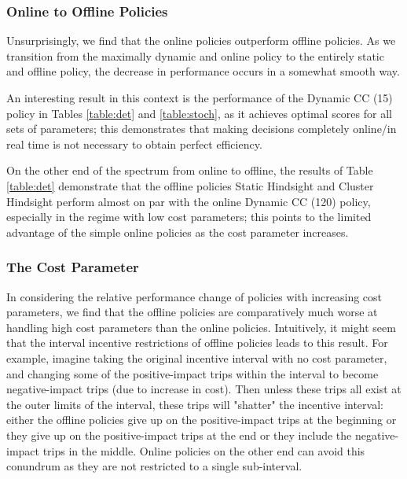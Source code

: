 \subsubsection{Online to Offline Policies}
Unsurprisingly, we find that the online policies outperform offline policies. As we transition from the maximally dynamic and online policy to the entirely static and offline policy, the decrease in performance occurs in a somewhat smooth way. %

An interesting result in this context is the performance of the Dynamic CC (15) policy in Tables \ref{table:det} and \ref{table:stoch}, as it achieves optimal scores for all sets of parameters; this demonstrates that making decisions completely online/in real time is not necessary to obtain perfect efficiency.

On the other end of the spectrum from online to offline, the results of Table \ref{table:det} demonstrate that the offline policies Static Hindsight and Cluster Hindsight perform almost on par with the online Dynamic CC (120) policy, especially in the regime with low cost parameters; this points to the limited advantage of the simple online policies as the cost parameter increases. %

\subsubsection{The Cost Parameter}
In considering the relative performance change of policies with increasing cost parameters, we find that the offline policies are comparatively much worse at handling high cost parameters than the online policies. Intuitively, it might seem that the interval incentive restrictions of offline policies leads to this result. For example, imagine taking the original incentive interval with no cost parameter, and changing some of the positive-impact trips within the interval to become negative-impact trips (due to increase in cost). Then unless these trips all exist at the outer limits of the interval, these trips will "shatter" the incentive interval: either the offline policies give up on the positive-impact trips at the beginning or they give up on the positive-impact trips at the end or they include the negative-impact trips in the middle. Online policies on the other end can avoid this conundrum as they are not restricted to a single sub-interval. 

